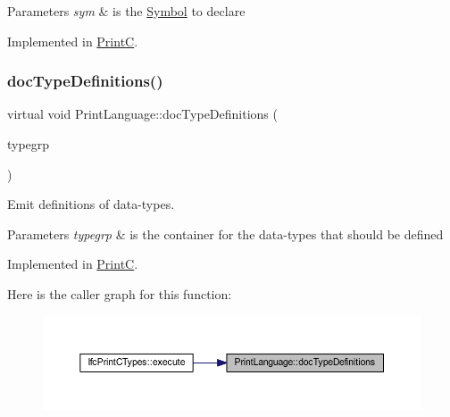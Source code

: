 \begin{DoxyParams}{Parameters}
{\em sym} & is the \mbox{\hyperlink{class_symbol}{Symbol}} to declare \\
\hline
\end{DoxyParams}


Implemented in \mbox{\hyperlink{class_print_c_a380029e0d567ee29b38225d6f6612b9c}{PrintC}}.

\mbox{\label{class_print_language_aea8fdf499dc7cba307e6cf513ed0ccab}} 
\subsubsection{\texorpdfstring{docTypeDefinitions()}{docTypeDefinitions()}}
{\footnotesize\ttfamily virtual void Print\+Language\+::doc\+Type\+Definitions (\begin{DoxyParamCaption}\item[{const \mbox{\hyperlink{class_type_factory}{Type\+Factory}} $\ast$}]{typegrp }\end{DoxyParamCaption})\hspace{0.3cm}{\ttfamily [pure virtual]}}



Emit definitions of data-\/types. 


\begin{DoxyParams}{Parameters}
{\em typegrp} & is the container for the data-\/types that should be defined \\
\hline
\end{DoxyParams}


Implemented in \mbox{\hyperlink{class_print_c_a6511933f0b8fd3f2fef8aa3920aa9de6}{PrintC}}.

Here is the caller graph for this function\+:
\nopagebreak
\begin{figure}[H]
\begin{center}
\leavevmode
\includegraphics[width=350pt]{class_print_language_aea8fdf499dc7cba307e6cf513ed0ccab_icgraph}
\end{center}
\end{figure}
\mbox{\label{class_print_language_ad5077f844d4095c52594fc946893db87}} 
